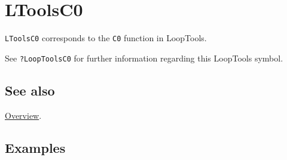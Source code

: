 \documentclass[../FeynHelpersManual.tex]{subfiles}
\begin{document}
\hypertarget{ltoolsc0}{
\section{LToolsC0}\label{ltoolsc0}}

\texttt{LToolsC0} corresponds to the \texttt{C0} function in LoopTools.

See \texttt{?LoopTools\textasciigrave C0} for further information
regarding this LoopTools symbol.

\subsection{See also}

\hyperlink{toc}{Overview}.

\subsection{Examples}
\end{document}
